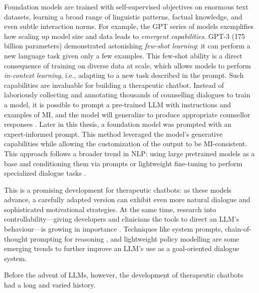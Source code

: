 Foundation models are trained with self-supervised objectives on enormous text
datasets, learning a broad range of linguistic patterns, factual knowledge, and even
subtle interaction norms. For example, the GPT series of models exemplifies how scaling
up model size and data leads to \emph{emergent capabilities}. GPT-3
\cite{brown2020language} (175 billion parameters) demonstrated astonishing
\emph{few-shot learning}: it can perform a new language task given only a few examples.
This few-shot ability is a direct consequence of training on diverse data at scale,
which allows models to perform \emph{in-context learning}, i.e., adapting to a new task
described in the prompt. Such capabilities are invaluable for building a therapeutic
chatbot. Instead of laboriously collecting and annotating thousands of counselling
dialogues to train a model, it is possible to prompt a pre-trained LLM with
instructions and examples of MI, and the model will generalize to produce appropriate
counsellor responses \cite{xie-etal-2024-shot-dialogue}. Later in this thesis, a
foundation model was prompted with an expert-informed prompt. This method leveraged the
model's generative capabilities while allowing the customization of the output to be
MI-consistent. This approach follows a broader trend in NLP: using large pretrained
models as a base and conditioning them via prompts or lightweight fine-tuning to
perform specialized dialogue tasks \cite{10.5555/3600270.3602070}.

This is a promising development for therapeutic chatbots: as these models advance, a
carefully adapted version can exhibit even more natural dialogue and sophisticated
motivational strategies. At the same time, research into controllability---giving
developers and clinicians the tools to direct an LLM's behaviour---is growing in
importance \cite{fernandez-etal-2025-lamia}. Techniques like system prompts,
chain-of-thought prompting for reasoning \cite{10.5555/3600270.3602070}, and
lightweight policy modelling \cite{du-etal-2024-rewarding} are some emerging trends to
further improve an LLM's use as a goal-oriented dialogue system.

Before the advent of LLMs, however, the development of therapeutic chatbots had a long
and varied history.

